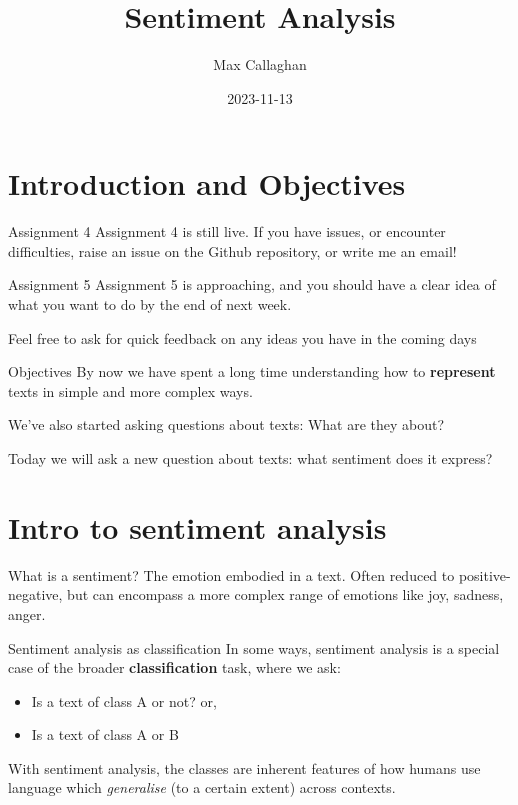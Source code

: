 \documentclass[
  10pt,
  ignorenonframetext,
  aspectratio=169]{beamer}
\title{Sentiment Analysis}
\author{Max Callaghan}
\date{2023-11-13}
\providecommand{\tightlist}{%
  \setlength{\itemsep}{0pt}\setlength{\parskip}{0pt}}
\begin{document}
\frame{\titlepage}

\hypertarget{introduction-and-objectives}{%
\section{Introduction and
Objectives}\label{introduction-and-objectives}}

\begin{frame}{Assignment 4}
\protect\hypertarget{assignment-4}{}
Assignment 4 is still live. If you have issues, or encounter
difficulties, raise an issue on the Github repository, or write me an
email!
\end{frame}

\begin{frame}{Assignment 5}
\protect\hypertarget{assignment-5}{}
Assignment 5 is approaching, and you should have a clear idea of what
you want to do by the end of next week.

Feel free to ask for quick feedback on any ideas you have in the coming
days
\end{frame}

\begin{frame}{Objectives}
\protect\hypertarget{objectives}{}
By now we have spent a long time understanding how to \textbf{represent}
texts in simple and more complex ways.

We've also started asking questions about texts: What are they about?

Today we will ask a new question about texts: what sentiment does it
express?
\end{frame}

\hypertarget{intro-to-sentiment-analysis}{%
\section{Intro to sentiment
analysis}\label{intro-to-sentiment-analysis}}

\begin{frame}{What is a sentiment?}
\protect\hypertarget{what-is-a-sentiment}{}
The emotion embodied in a text. Often reduced to positive-negative, but
can encompass a more complex range of emotions like joy, sadness, anger.
\end{frame}

\begin{frame}{Sentiment analysis as classification}
\protect\hypertarget{sentiment-analysis-as-classification}{}
In some ways, sentiment analysis is a special case of the broader
\textbf{classification} task, where we ask:

\begin{itemize}
\tightlist
\item
  Is a text of class A or not? or,
\item
  Is a text of class A or B
\end{itemize}

With sentiment analysis, the classes are inherent features of how humans
use language which \emph{generalise} (to a certain extent) across
contexts.
\end{frame}
\end{document}
